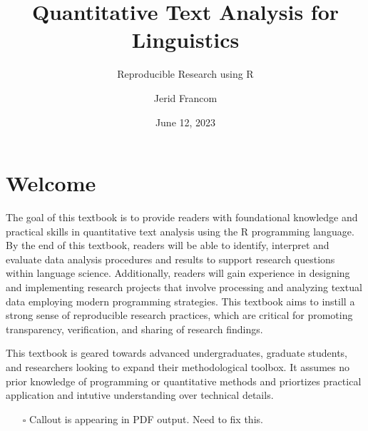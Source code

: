 \documentclass[
  letterpaper,
]{latex/krantz}
\title{Quantitative Text Analysis for Linguistics}
\subtitle{Reproducible Research using R}
\author{Jerid Francom}
\date{June 12, 2023}
\providecommand{\tightlist}{%
  \setlength{\itemsep}{0pt}\setlength{\parskip}{0pt}}\usepackage{longtable,booktabs,array}
\renewcommand*\contentsname{Table of contents}
\newcommand\contentsname{Table of contents}
\begin{document}
\maketitle
\ifdefined\Shaded\renewenvironment{Shaded}{\begin{tcolorbox}[interior hidden, sharp corners, breakable, boxrule=0pt, enhanced, frame hidden, borderline west={3pt}{0pt}{shadecolor}]}{\end{tcolorbox}}\fi

\renewcommand*\contentsname{Table of contents}
{
\setcounter{tocdepth}{2}
\tableofcontents
}

\hypertarget{welcome}{%
\chapter*{Welcome}\label{welcome}}


The goal of this textbook is to provide readers with foundational
knowledge and practical skills in quantitative text analysis using the R
programming language. By the end of this textbook, readers will be able
to identify, interpret and evaluate data analysis procedures and results
to support research questions within language science. Additionally,
readers will gain experience in designing and implementing research
projects that involve processing and analyzing textual data employing
modern programming strategies. This textbook aims to instill a strong
sense of reproducible research practices, which are critical for
promoting transparency, verification, and sharing of research findings.

This textbook is geared towards advanced undergraduates, graduate
students, and researchers looking to expand their methodological
toolbox. It assumes no prior knowledge of programming or quantitative
methods and priortizes practical application and intutive understanding
over technical details.

\begin{itemize}
\tightlist
\item[$\square$]
  Callout is appearing in PDF output. Need to fix this.
\end{itemize}
\end{document}
